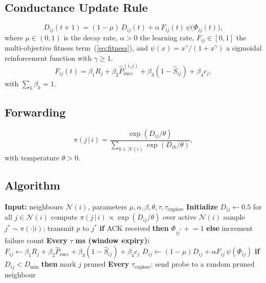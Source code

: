 \documentclass[journal,twoside,web]{IEEEtran}
\begin{document}
\subsection{Conductance Update Rule}
\begin{equation}
D_{ij}(t{+}1) = (1-\mu)\,D_{ij}(t) + \alpha\,F_{ij}(t)\,\psi\!\big(\Phi_{ij}(t)\big),
\label{eq:dupdate}
\end{equation}
where $\mu\in(0,1)$ is the decay rate, $\alpha>0$ the learning rate,
$F_{ij}\in[0,1]$ the multi-objective fitness term~(\ref{eq:fitness}),
and $\psi(x)=x^{\gamma}/(1+x^{\gamma})$ a sigmoidal reinforcement
function with $\gamma \ge 1$.
\begin{equation}
F_{ij}(t) = \beta_1 R_j + \beta_2 \hat{P}_{\text{succ}}^{(i,j)}
          + \beta_3 (1-\hat{S}_{ij}) + \beta_4 c_j,
\label{eq:fitness}
\end{equation}
with $\sum_k \beta_k = 1$.

\subsection{Forwarding}
\begin{equation}
\pi(j\,|\,i)
   = \frac{\exp(D_{ij}/\theta)}
          {\sum_{k\in\mathcal{N}(i)} \exp(D_{ik}/\theta)},
\label{eq:softmax}
\end{equation}
with temperature $\theta>0$.

\subsection{Algorithm}
\begin{algorithmic}[1]
\STATE \textbf{Input:} neighbours $\mathcal{N}(i)$, parameters
       $\mu,\alpha,\beta,\theta,\tau,\tau_{\text{explore}}$
\STATE \textbf{Initialize} $D_{ij}\leftarrow 0.5$ for all $j\in\mathcal{N}(i)$
   \STATE compute $\pi(j\,|\,i)\propto \exp(D_{ij}/\theta)$ over active $\mathcal{N}(i)$
   \STATE sample $j^* \sim \pi(\cdot|i)$; transmit $p$ to $j^*$
   \STATE \textbf{if} ACK received \textbf{then} $\Phi_{ij^*}\mathrel{+}=1$
          \textbf{else} increment failure count
\ENDFOR
\STATE \textbf{Every} $\tau$ \textbf{ms (window expiry):}
   \STATE $F_{ij}\leftarrow \beta_1 R_j + \beta_2 \hat{P}_{\text{succ}}
          + \beta_3 (1-\hat{S}_{ij}) + \beta_4 c_j$
   \STATE $D_{ij}\leftarrow (1-\mu)D_{ij} + \alpha F_{ij}\,\psi(\Phi_{ij})$
   \STATE \textbf{if} $D_{ij}<D_{\min}$ \textbf{then} mark $j$ pruned
\ENDFOR
\STATE \textbf{Every} $\tau_{\text{explore}}$: send probe to a random pruned neighbour
\end{algorithmic}
\end{document}

